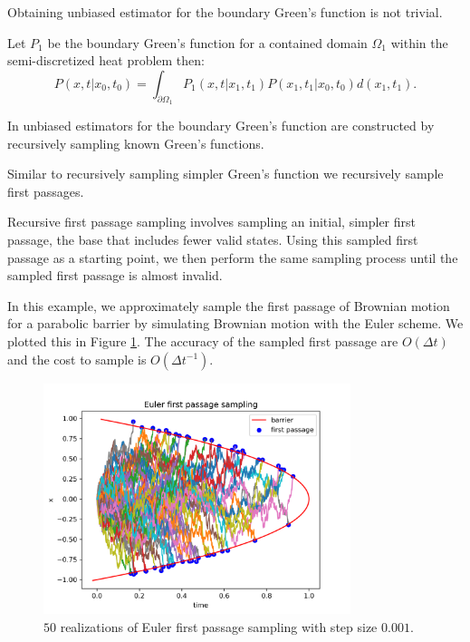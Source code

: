 \documentclass[a4paper,12pt]{article}
\begin{document}
Obtaining unbiased estimator for the boundary Green's function is not trivial.

\begin{lemma}
  Let $P_{1}$ be the boundary Green's function for a contained domain $\Omega_{1}$ within the semi-discretized heat problem
  then:
  \begin{equation}
    P(x,t|x_{0},t_{0})= \int_{\partial \Omega_{1}} P_{1}(x,t|x_{1},t_{1}) P(x_{1},t_{1}|x_{0},t_{0}) d(x_{1},t_{1})
    .
  \end{equation}
\end{lemma}


\begin{related}
  In \cite{qi_bidirectional_2022} unbiased estimators for the boundary Green's function are constructed
  by recursively sampling known Green's functions.
\end{related}

Similar to recursively  sampling simpler Green's function we recursively sample first passages.

\begin{technique}
  Recursive first passage sampling involves sampling an initial,
  simpler first passage, the base that includes fewer valid states. Using
  this sampled first passage as a starting point, we
  then perform the same sampling process until the sampled
  first passage is almost invalid.
\end{technique}

\begin{example} \label{ex:euler first passage sampling}
  In this example, we approximately sample the first passage of Brownian motion
  for a parabolic barrier by simulating Brownian motion with the Euler scheme. We plotted
  this in Figure \ref{fig:Euler first passage para}. The accuracy of the sampled first passage
  are $O(\Delta t)$ and the cost to sample is $O(\Delta t ^{-1})$.

  \begin{figure}[h!]
    \centering
    \includegraphics[width=0.8\textwidth]{plots/Euler first passage para.png}
    \caption{ $50$ realizations of Euler first passage sampling with step size $0.001$.}
    \label{fig:Euler first passage para}
  \end{figure}
\end{example}
\end{document}
